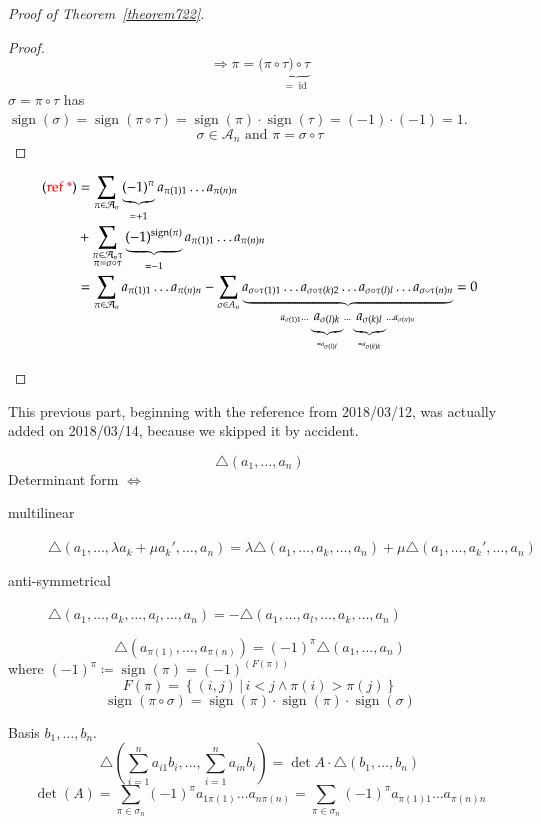 \documentclass{article}
\numberwithin{lecref}{section}
\newcommand{\setdef}[2]{\left\{\left.#1\,\right|\,#2\right\}}
\DeclareMathOperator{\sign}{sign}
\begin{document}
\begin{proof}[Proof of Theorem~\ref{theorem722}]
\begin{enumerate}
\begin{proof}
        \[ \Rightarrow \pi = (\pi \circ \underbrace{\tau) \circ \tau}_{= \operatorname{id}} \]
        $\sigma = \pi \circ \tau$ has $\sign(\sigma) = \sign(\pi \circ \tau) = \sign(\pi) \cdot \sign(\tau) = (-1) \cdot (-1) = 1$.
        \[ \sigma \in \mathcal A_n \text{ and } \pi = \sigma \circ \tau \]
      \end{proof}
      \begin{align*}
        \text{({\color{red} ref *})} &= \sum_{\pi \in \mathcal A_n} \underbrace{(-1)^\pi}_{=+1} a_{\pi(1) 1} \dots a_{\pi(n) n} \\
          &+ \sum_{\substack{\pi \in \mathcal A_n \tau \\ \pi = \sigma \circ \tau}} \underbrace{(-1)^{\sign(\pi)}}_{= -1} a_{\pi(1) 1} \dots a_{\pi(n) n} \\
          &= \sum_{\pi \in \mathcal A_n} a_{\pi(1) 1} \dots a_{\pi(n) n} - \sum_{\sigma \in A_n} \underbrace{
            a_{\sigma \circ \tau(1) 1} \dots a_{\sigma \circ \tau(k) 2} \dots a_{\sigma \circ \tau(l) l} \dots a_{\sigma \circ \tau(n) n}
          }_{
            a_{\sigma(1) 1} \dots \underbrace{a_{\sigma(l) k}}_{=a_{\sigma(l) l}} \dots \underbrace{a_{\sigma(k) l}}_{= a_{\sigma(k) k}} \dots a_{\sigma(n) n}
          } = 0
      \end{align*}
  \end{enumerate}
\end{proof}

This previous part, beginning with the reference from 2018/03/12, was actually added on 2018/03/14, because we skipped it by accident.

\[ \triangle(a_1, \dots, a_n) \]
Determinant form $\iff$
\begin{description}
  \item[multilinear] $\triangle(a_1, \dots, \lambda a_k + \mu a_k', \dots, a_n) = \lambda \triangle(a_1, \dots, a_k, \dots, a_n) + \mu \triangle(a_1, \dots, a_k', \dots, a_n)$
  \item[anti-symmetrical] $\triangle(a_1, \dots, a_k, \dots, a_l, \dots, a_n) = -\triangle(a_1, \dots, a_l, \dots, a_k, \dots, a_n)$
\end{description}

\[ \triangle (a_{\pi(1)}, \dots, a_{\pi(n)}) = (-1)^\pi \triangle(a_1,\dots,a_n) \]
where $(-1)^\pi \coloneqq \sign(\pi) = (-1)^{(F(\pi))}$
\[ F(\pi) = \setdef{(i,j)}{i < j \land \pi(i) > \pi(j)} \]
\[ \sign(\pi \circ \sigma) = \sign(\pi) \cdot \sign(\pi) \cdot \sign(\sigma) \]

Basis $b_1,\dots,b_n$.
\[ \triangle(\sum_{i=1}^n a_{i1} b_i, \dots, \sum_{i=1}^n a_{in} b_i) = \det{A} \cdot \triangle(b_1, \dots, b_n) \]
\[ \det(A) = \sum_{\pi \in \sigma_n} (-1)^\pi  a_{1\pi(1)} \dots a_{n\pi(n)} = \sum_{\pi \in \sigma_n} (-1)^\pi a_{\pi(1) 1} \dots a_{\pi(n) n} \]
\end{document}

